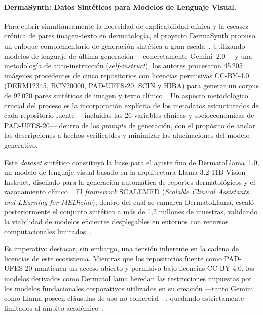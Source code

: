 \paragraph{DermaSynth: Datos Sintéticos para Modelos de Lenguaje Visual.}
Para cubrir simultáneamente la necesidad de explicabilidad clínica y la escasez crónica de pares 
imagen-texto en dermatología, el proyecto DermaSynth propuso un enfoque complementario de generación 
sintética a gran escala~\cite{arxiv_dermasynth}. Utilizando modelos de lenguaje de última generación 
---concretamente Gemini~2.0--- y una metodología de auto-instrucción (\textit{self-instruct}), los 
autores procesaron 45\,205 imágenes procedentes de cinco repositorios con licencias permisivas 
CC-BY-4.0 (DERM12345, BCN20000, PAD-UFES-20, SCIN y HIBA) para generar un corpus de 92\,020 pares 
sintéticos de imagen y texto clínico~\cite{arxiv_dermasynth}. Un aspecto metodológico crucial del 
proceso es la incorporación explícita de los metadatos estructurados de cada repositorio fuente 
---incluidas las 26 variables clínicas y socioeconómicas de PAD-UFES-20--- dentro de los 
\textit{prompts} de generación, con el propósito de anclar las descripciones a hechos verificables y 
minimizar las alucinaciones del modelo generativo.

Este \textit{dataset} sintético constituyó la base para el ajuste fino de DermatoLlama~1.0, un modelo 
de lenguaje visual basado en la arquitectura Llama-3.2-11B-Vision-Instruct, diseñado para la generación 
automática de reportes dermatológicos y el razonamiento clínico~\cite{arxiv_dermasynth,medrxiv_scalemed}. 
El \textit{framework} SCALEMED (\textit{Scalable Clinical Assistants and LEarning for MEDicine}), dentro 
del cual se enmarca DermatoLlama, escaló posteriormente el conjunto sintético a más de 1,2 millones de 
muestras, validando la viabilidad de modelos eficientes desplegables en entornos con recursos 
computacionales limitados~\cite{medrxiv_scalemed}.

Es imperativo destacar, sin embargo, una tensión inherente en la cadena de licencias de este ecosistema. 
Mientras que los repositorios fuente como PAD-UFES-20 mantienen un acceso abierto y permisivo bajo 
licencias CC-BY-4.0, los modelos derivados como DermatoLlama heredan las restricciones impuestas por 
los modelos fundacionales corporativos utilizados en su creación ---tanto Gemini como Llama poseen 
cláusulas de uso no comercial---, quedando estrictamente limitados al ámbito 
académico~\cite{arxiv_dermasynth,medrxiv_scalemed}.

